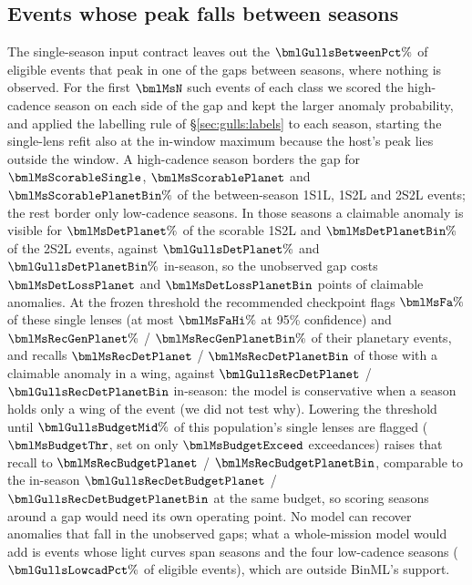 \subsection{Events whose peak falls between seasons}\label{sec:gulls:seasons}

The single-season input contract leaves out the $\bmlGullsBetweenPct\%$ of eligible events that peak in
one of the gaps between seasons, where nothing is observed. For the first $\bmlMsN$ such events of each
class we scored the high-cadence season on each side of the gap and kept the larger anomaly probability,
and applied the labelling rule of \S\ref{sec:gulls:labels} to each season, starting the single-lens refit
also at the in-window maximum because the host's peak lies outside the window. A high-cadence season
borders the gap for $\bmlMsScorableSingle$, $\bmlMsScorablePlanet$ and $\bmlMsScorablePlanetBin\%$ of the
between-season 1S1L, 1S2L and 2S2L events; the rest border only low-cadence seasons. In those seasons a
claimable anomaly is visible for $\bmlMsDetPlanet\%$ of the scorable 1S2L and $\bmlMsDetPlanetBin\%$ of the
2S2L events, against $\bmlGullsDetPlanet\%$ and $\bmlGullsDetPlanetBin\%$ in-season, so the unobserved gap
costs $\bmlMsDetLossPlanet$ and $\bmlMsDetLossPlanetBin$ points of claimable anomalies. At the frozen threshold
the recommended checkpoint flags $\bmlMsFa\%$ of these single lenses (at most $\bmlMsFaHi\%$ at 95\%
confidence) and $\bmlMsRecGenPlanet\%$ / $\bmlMsRecGenPlanetBin\%$ of their planetary events, and recalls
$\bmlMsRecDetPlanet$ / $\bmlMsRecDetPlanetBin$ of those with a claimable anomaly in a wing, against
$\bmlGullsRecDetPlanet$ / $\bmlGullsRecDetPlanetBin$ in-season: the model is conservative when a season
holds only a wing of the event (we did not test why). Lowering the threshold until $\bmlGullsBudgetMid\%$ of this population's single lenses
are flagged ($\bmlMsBudgetThr$, set on only $\bmlMsBudgetExceed$ exceedances) raises that recall to
$\bmlMsRecBudgetPlanet$ / $\bmlMsRecBudgetPlanetBin$, comparable to the in-season $\bmlGullsRecDetBudgetPlanet$ /
$\bmlGullsRecDetBudgetPlanetBin$ at the same budget, so scoring seasons around a gap would need its own
operating point. No model can recover anomalies that fall in the unobserved gaps; what a whole-mission
model would add is events whose light curves span seasons and the four low-cadence seasons
($\bmlGullsLowcadPct\%$ of eligible events), which are outside BinML's support.

